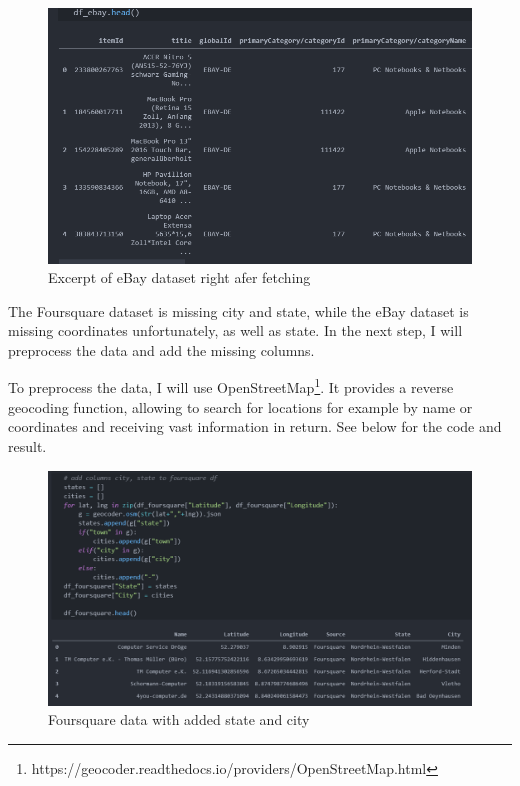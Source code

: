 \begin{figure}[H]
	\includegraphics[width=\textwidth]{Bilder/eBay.PNG}
	\caption{Excerpt of eBay dataset right afer fetching}
\end{figure}

The Foursquare dataset is missing city and state, while the eBay dataset is missing coordinates unfortunately, as well as state. In the next step, I will preprocess the data and add the missing columns.

To preprocess the data, I will use OpenStreetMap\footnote{https://geocoder.readthedocs.io/providers/OpenStreetMap.html}. It provides a reverse geocoding function, allowing to search for locations for example by name or coordinates and receiving vast information in return. See below for the code and result.

\begin{figure}[H]
	\includegraphics[width=\textwidth]{Bilder/Foursquare_preprocessed.PNG}
	\caption{Foursquare data with added state and city}
\end{figure}


